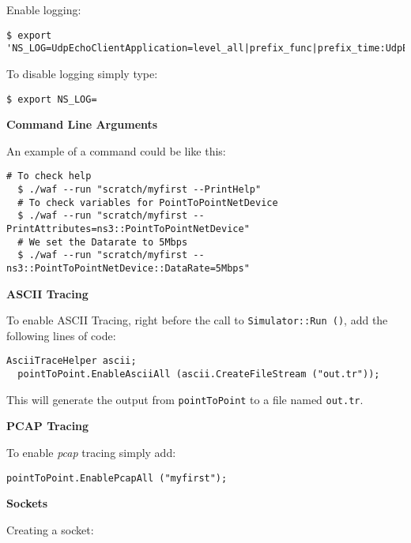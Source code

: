 Enable logging:

\begin{lstlisting}[escapechar=@, language=myshell,caption={Enabling logging in ns-3}, captionpos=b]
  $ export 'NS_LOG=UdpEchoClientApplication=level_all|prefix_func|prefix_time:UdpEchoServerApplication=level_all|prefix_func|prefix_time'
\end{lstlisting}

To disable logging simply type:

\begin{lstlisting}[escapechar=@, language=myshell,caption={Disabling logging in ns-3}, captionpos=b]
  $ export NS_LOG=
\end{lstlisting}

\textbf{Command Line Arguments}

An example of a command could be like this:

\begin{lstlisting}[escapechar=@, language=myshell,caption={Command line arguments}, captionpos=b]
  # To check help 
  $ ./waf --run "scratch/myfirst --PrintHelp"
  # To check variables for PointToPointNetDevice
  $ ./waf --run "scratch/myfirst --PrintAttributes=ns3::PointToPointNetDevice"
  # We set the Datarate to 5Mbps
  $ ./waf --run "scratch/myfirst --ns3::PointToPointNetDevice::DataRate=5Mbps"
\end{lstlisting}

\textbf{ASCII Tracing}

To enable ASCII Tracing, right before the call to \texttt{Simulator::Run ()}, add the following lines
of code:

\begin{lstlisting}[escapechar=@, language=myC++,caption={ASCII tracing}, captionpos=b]
  AsciiTraceHelper ascii;
  pointToPoint.EnableAsciiAll (ascii.CreateFileStream ("out.tr"));
\end{lstlisting}

This will generate the output from \texttt{pointToPoint} to a file named \texttt{out.tr}.

\textbf{PCAP Tracing}

To enable \textit{pcap} tracing simply add:
\begin{lstlisting}[escapechar=@, language=myC++,caption={PCAP tracing}, captionpos=b]
  pointToPoint.EnablePcapAll ("myfirst");
\end{lstlisting}

\textbf{Sockets}

Creating a socket:


